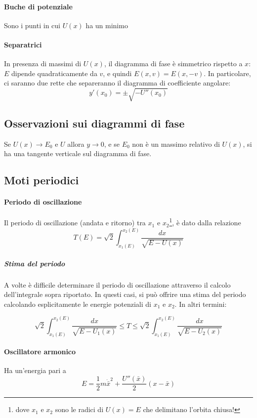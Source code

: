 \documentclass[a4paper,12pt]{article}
\begin{document}
\paragraph{Buche di potenziale}
Sono i punti in cui $U(x)$ ha un minimo
\paragraph{Separatrici}
In presenza di massimi di $U(x)$, il diagramma di fase è simmetrico rispetto a $x$: $E$ dipende quadraticamente da $v$, e quindi $E(x, v) = E(x, -v)$.
In particolare, ci saranno due rette che separeranno il diagramma di coefficiente angolare:
$$y'(x_0) = \pm\sqrt{-U''(x_0)}$$

\subsection{Osservazioni sui diagrammi di fase}
Se $U(x) \to E_0$ e $U$ allora $y \to 0$, e se $E_0$ non è un massimo relativo di $U(x)$, si ha una tangente verticale sul diagramma di fase.


\subsection{Moti periodici}
\paragraph{Periodo di oscillazione}
Il periodo di oscillazione (andata e ritorno) tra $x_1$ e $x_2$\footnote{dove $x_1$ e $x_2$ sono le radici di $U(x) = E $ che delimitano l'orbita chiusa! }, è dato dalla relazione
$$ T(E) = \sqrt{2}\int_{x_1(E)}^{x_2(E)} \dfrac{dx}{\sqrt{E-U(x)}}$$
\subparagraph{Stima del periodo}
A volte è difficile determinare il periodo di oscillazione attraverso il calcolo dell'integrale sopra riportato.
In questi casi, si può offrire una stima del periodo calcolando esplicitamente le energie potenziali di $x_1$ e $x_2$. In altri termini:

$$ \sqrt{2}\int_{x_1(E)}^{x_2(E)} \dfrac{dx}{\sqrt{E-U_1(x)}} \leq T \leq \sqrt{2}\int_{x_1(E)}^{x_2(E)} \dfrac{dx}{\sqrt{E-U_2(x)}} $$

\paragraph{Oscillatore armonico}
Ha un'energia pari a
$$ E = \dfrac{1}{2} m \dot{\bar{x}}^2 + \dfrac{U''(\bar{x})}{2} (x-\bar{x})$$
\end{document}
